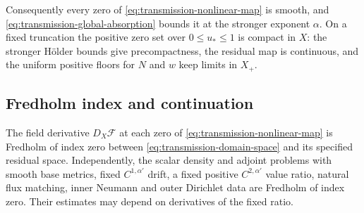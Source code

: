 Consequently every zero of \eqref{eq:transmission-nonlinear-map}
is smooth, and \eqref{eq:transmission-global-absorption} bounds it
at the stronger exponent $\alpha$.  On a fixed truncation the
positive zero set over $0\leq u_*\leq1$ is compact in $X$:
the stronger H\"older bounds give precompactness, the residual map
is continuous, and the uniform positive floors for $N$ and $w$
keep limits in $X_+$.

\subsection{Fredholm index and continuation}

\begin{lemma}
\label{lem:transmission-fredholm}
The field derivative $D_X\mathscr F$ at each zero of
\eqref{eq:transmission-nonlinear-map} is Fredholm of index zero
between \eqref{eq:transmission-domain-space} and its specified
residual space.  Independently, the scalar density and adjoint
problems with smooth base metrics, fixed $C^{1,\alpha'}$ drift,
a fixed positive $C^{2,\alpha'}$ value ratio, natural flux matching,
inner Neumann and outer Dirichlet data are
Fredholm of index zero.  Their estimates may depend on derivatives
of the fixed ratio.
\end{lemma}

